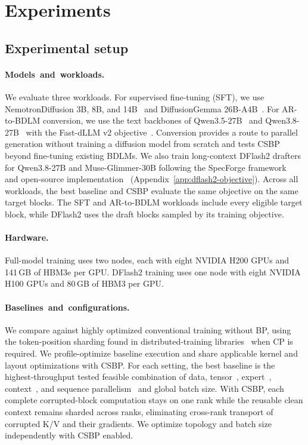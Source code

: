 \section{Experiments}
\label{sec:experiments}

\subsection{Experimental setup}
\label{sec:experimental-setup}

\paragraph{\mbox{Models and workloads.}}
We evaluate three workloads. For supervised fine-tuning (SFT), we use
NemotronDiffusion 3B, 8B, and 14B~\citep{fu2026nemotronlabsdiffusion} and
DiffusionGemma 26B-A4B~\citep{odonoghue2026diffusiongemma}. For AR-to-BDLM
conversion, we use the text backbones of Qwen3.5-27B~\citep{qwen2026qwen35}
and Qwen3.8-27B~\citep{qwen2026qwen38} with the Fast-dLLM v2
objective~\citep{wu2025fastdllmv2}. Conversion provides a route to parallel
generation without training a diffusion model from scratch and tests CSBP
beyond fine-tuning existing BDLMs. We also train long-context DFlash2
drafters~\citep{inco2026dflash2} for Qwen3.8-27B and Muse-Glimmer-30B following
the SpecForge framework~\citep{li2026specforge} and open-source
implementation~\citep{specforge2025} (Appendix~\ref{app:dflash2-objective}).
Across all workloads, the best baseline and CSBP evaluate the same objective on the same
target blocks. The SFT and AR-to-BDLM workloads include every eligible target
block, while DFlash2 uses the draft blocks sampled by its training objective.

\paragraph{\mbox{Hardware.}}
Full-model training uses two nodes, each with eight NVIDIA H200 GPUs and
141\,GB of HBM3e per GPU. DFlash2 training uses one node with eight NVIDIA
H100 GPUs and 80\,GB of HBM3 per GPU.

\paragraph{\mbox{Baselines and configurations.}}
We compare against highly optimized conventional training without BP, using
the token-position sharding found in distributed-training
libraries~\citep{nvidia_megatron_cp,pytorch_torchtitan} when CP is required. We
profile-optimize baseline execution and share applicable kernel and layout
optimizations with CSBP. For each setting, the best baseline is the
highest-throughput tested feasible combination of data,
tensor~\citep{shoeybi2019megatron}, expert~\citep{lepikhin2020gshard},
context~\citep{liu2023ringattention,jacobs2023ulysses}, and sequence
parallelism~\citep{korthikanti2022recomputation} and global batch size. With
CSBP, each complete corrupted-block computation stays on one rank while the
reusable clean context remains sharded across ranks, eliminating cross-rank
transport of corrupted K/V and their gradients. We optimize topology and batch
size independently with CSBP enabled.


